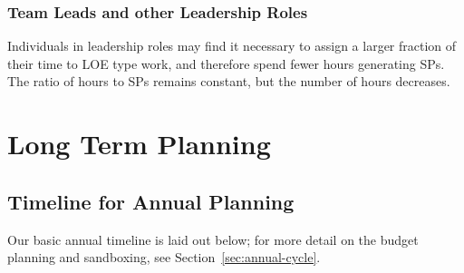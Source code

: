 \subsubsection{Team Leads and other Leadership Roles}

Individuals in leadership roles may find it necessary to assign a larger fraction of their time to \gls{LOE} type work, and therefore spend fewer hours generating \glspl{SP}.
The ratio of hours to \glspl{SP} remains constant, but the number of hours decreases.

\section{Long Term Planning}
\label{sec:long-term-plan}

\subsection{Timeline for Annual Planning}
\label{sec:annual-planning-timeline}

Our basic annual timeline is laid out below; for more detail on the budget planning and sandboxing, see Section~\ref{sec:annual-cycle}.

